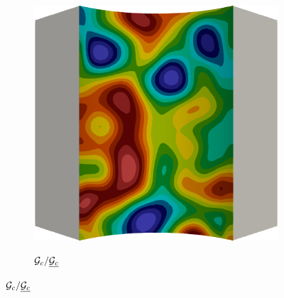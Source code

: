 \begin{frame}
\begin{columns}[T]
\begin{column}{0.6\textwidth}
\begin{figure}
{\begin{subfigure}{0.25\textwidth}
            \centering
            \includegraphics[width=\textwidth]{examples/figures/Gc.0000}
          \end{subfigure}
          \begin{subfigure}{0.1\textwidth}
            \centering
            \caption*{${\mathcal{G}_c}/\underline{{\mathcal{G}_c}}$}

\end{subfigure}}
\end{figure}
\end{column}
\end{columns}
\end{frame}
